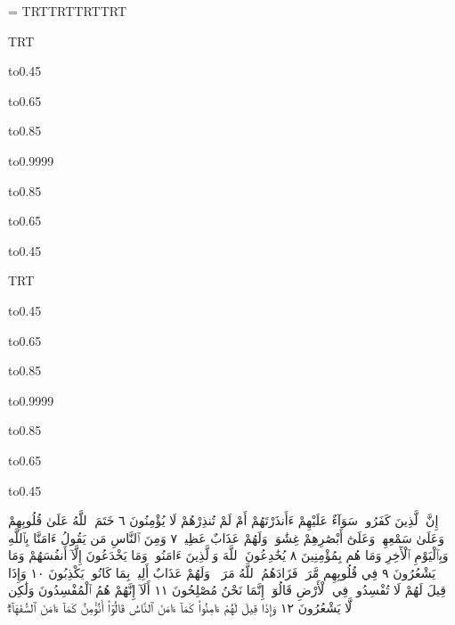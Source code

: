 \documentclass{article}
\begin{document}
\setbox\ayaframe=\ayagraphic
\medinafontvar\pagedir TRT\pardir TRT\bodydir TRT\textdir TRT

\pageheight
{\fatiha\textdir TRT
\leavevmode{}\pageheight
\centerline{\hbox to0.45\textwidth{بِسْمِ ٱللَّهِ ٱلرَّحْمَٰنِ ٱلرَّحِيمِ}}
\centerline{\hbox to0.65\textwidth{الٓمٓ ١ ذَٰلِكَ ٱلْكِتَٰبُ لَا رَيْبَۛ فِيهِۛ هُدࣰى}}
\centerline{\hbox to0.85\textwidth{لِّلْمُتَّقِينَ ٢ ٱلَّذِينَ يُؤْمِنُونَ بِٱلْغَيْبِ وَيُقِيمُونَ ٱلصَّلَوٰةَ}}
\centerline{\hbox to0.9999\textwidth{وَمِمَّا رَزَقْنَٰهُمْ يُنفِقُونَ ٣ وَٱلَّذِينَ يُؤْمِنُونَ بِمَآ أُنزِلَ}}
\centerline{\hbox to0.85\textwidth{إِلَيْكَ وَمَآ أُنزِلَ مِن قَبْلِكَ وَبِٱلْأٓخِرَةِ هُمْ يُوقِنُونَ ٤}}
\centerline{\hbox to0.65\textwidth{أُو۟لَٰٓئِكَ عَلَىٰ هُدࣰى مِّن رَّبِّهِمْۖ وَأُو۟لَٰٓئِكَ}}
\centerline{\hbox to0.45\textwidth{هُمُ ٱلْمُفْلِحُونَ ٥}}
}
\vfill
\newpage
{}
\pageheight
{\fatiha\textdir TRT
\leavevmode{}\pageheight
\centerline{\hbox to0.45\textwidth{بِسْمِ ٱللَّهِ ٱلرَّحْمَٰنِ ٱلرَّحِيمِ}}
\centerline{\hbox to0.65\textwidth{الٓمٓ ١ ذَٰلِكَ ٱلْكِتَٰبُ لَا رَيْبَۛ فِيهِۛ هُدࣰى}}
\centerline{\hbox to0.85\textwidth{لِّلْمُتَّقِينَ ٢ ٱلَّذِينَ يُؤْمِنُونَ بِٱلْغَيْبِ وَيُقِيمُونَ ٱلصَّلَوٰةَ}}
\centerline{\hbox to0.9999\textwidth{وَمِمَّا رَزَقْنَٰهُمْ يُنفِقُونَ ٣ وَٱلَّذِينَ يُؤْمِنُونَ بِمَآ أُنزِلَ}}
\centerline{\hbox to0.85\textwidth{إِلَيْكَ وَمَآ أُنزِلَ مِن قَبْلِكَ وَبِٱلْأٓخِرَةِ هُمْ يُوقِنُونَ ٤}}
\centerline{\hbox to0.65\textwidth{أُو۟لَٰٓئِكَ عَلَىٰ هُدࣰى مِّن رَّبِّهِمْۖ وَأُو۟لَٰٓئِكَ}}
\centerline{\hbox to0.45\textwidth{هُمُ ٱلْمُفْلِحُونَ ٥}}
}
\vfill
\newpage
{}
\sloppy
إِنَّ ٱلَّذِينَ كَفَرُوا۟ سَوَآءٌ عَلَيْهِمْ ءَأَنذَرْتَهُمْ أَمْ لَمْ تُنذِرْهُمْ
لَا يُؤْمِنُونَ ٦ خَتَمَ ٱللَّهُ عَلَىٰ قُلُوبِهِمْ وَعَلَىٰ سَمْعِهِمْۖ وَعَلَىٰٓ
أَبْصَٰرِهِمْ غِشَٰوَةࣱۖ وَلَهُمْ عَذَابٌ عَظِيمࣱ ٧ وَمِنَ ٱلنَّاسِ
مَن يَقُولُ ءَامَنَّا بِٱللَّهِ وَبِٱلْيَوْمِ ٱلْأٓخِرِ وَمَا هُم بِمُؤْمِنِينَ ٨
يُخَٰدِعُونَ ٱللَّهَ وَٱلَّذِينَ ءَامَنُوا۟ وَمَا يَخْدَعُونَ إِلَّآ أَنفُسَهُمْ
وَمَا يَشْعُرُونَ ٩ فِي قُلُوبِهِم مَّرَضࣱ فَزَادَهُمُ ٱللَّهُ مَرَضࣰاۖ
وَلَهُمْ عَذَابٌ أَلِيمُۢ بِمَا كَانُوا۟ يَكْذِبُونَ ١٠ وَإِذَا قِيلَ لَهُمْ
لَا تُفْسِدُوا۟ فِي ٱلْأَرْضِ قَالُوٓا۟ إِنَّمَا نَحْنُ مُصْلِحُونَ ١١ أَلَآ إِنَّهُمْ
هُمُ ٱلْمُفْسِدُونَ وَلَٰكِن لَّا يَشْعُرُونَ ١٢ وَإِذَا قِيلَ لَهُمْ
ءَامِنُوا۟ كَمَآ ءَامَنَ ٱلنَّاسُ قَالُوٓا۟ أَنُؤْمِنُ كَمَآ ءَامَنَ ٱلسُّفَهَآءُۗ
\end{document}

